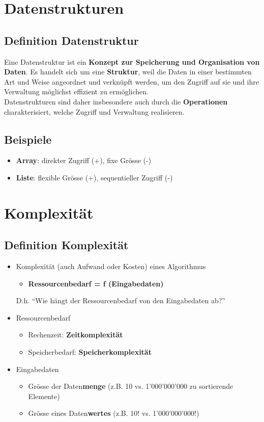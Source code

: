\section{Datenstrukturen}
\subsection{Definition Datenstruktur}
Eine Datenstruktur ist ein \textbf{Konzept zur Speicherung und Organisation von Daten}. Es handelt sich um eine \textbf{Struktur}, weil die Daten in einer bestimmten Art und Weise angeordnet und verknüpft werden, um den Zugriff auf sie und ihre Verwaltung möglichst effizient zu ermöglichen.\\
Datenstrukturen sind daher insbesondere auch durch die \textbf{Operationen} charakterisiert, welche Zugriff und Verwaltung realisieren.
\subsection{Beispiele}
\begin{itemize}[noitemsep,topsep=0pt,leftmargin=*]
    \item \textbf{Array}: direkter Zugriff (+), fixe Grösse (-)
    \item \textbf{Liste}: flexible Grösse (+), sequentieller Zugriff (-)
\end{itemize}

\section{Komplexität}
\subsection{Definition Komplexität}
\begin{itemize}[noitemsep,topsep=0pt,leftmargin=*]
    \item Komplexität (auch Aufwand oder Kosten) eines Algorithmus
    \begin{itemize}[noitemsep,topsep=0pt,leftmargin=*]
        \item \textbf{Ressourcenbedarf = f (Eingabedaten)}
    \end{itemize}
    \subitem D.h. "`Wie hängt der Ressourcenbedarf von den Eingabedaten ab?"'
    \item Ressourcenbedarf
    \begin{itemize}[noitemsep,topsep=0pt,leftmargin=*]
        \item Rechenzeit: \textbf{Zeitkomplexität}
        \item Speicherbedarf: \textbf{Speicherkomplexität}
    \end{itemize}
    \item Eingabedaten
    \begin{itemize}[noitemsep,topsep=0pt,leftmargin=*]
        \item Grösse der Daten\textbf{menge} (z.B. 10 vs. 1'000'000'000 zu sortierende Elemente)
        \item Grösse eines Daten\textbf{wertes} (z.B. 10! vs. 1'000'000'000!)
    \end{itemize}
\end{itemize}

